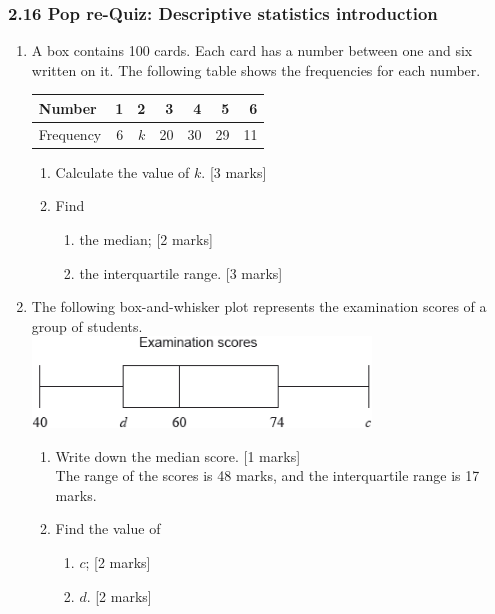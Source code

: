 \documentclass[12pt, twoside]{article}
\begin{document}
\subsubsection*{2.16 Pop re-Quiz: Descriptive statistics introduction}

\begin{enumerate} 
 
  \item A box contains 100 cards. Each card has a number between one and six written on it. The following table shows the frequencies for each number.
  
  \begin{tabular}{|l|r|r|r|r|r|r|}
    \hline
    Number & 1 & 2 & 3 & 4 & 5 & 6\\ 
    \hline 
    Frequency & 6 & $k$ & 20 & 30 & 29 & 11\\ 
    \hline 
    \end{tabular}

  \begin{enumerate}
    \item Calculate the value of $k$. \hfill [3 marks] \vspace{2cm}
    \item Find
    \begin{enumerate}
      \item the median; \hfill [2 marks] \vspace{2cm}
      \item the interquartile range. \hfill [3 marks] \vspace{2cm}
    \end{enumerate}
  \end{enumerate}

  \item The following box-and-whisker plot represents the examination scores of a group of students.\\
  \includegraphics[width=9cm]{2-16exam-scores-box-plot.png}
  \begin{enumerate}
    \item Write down the median score. \hfill [1 marks]\\[1.25cm]
    The range of the scores is 48 marks, and the interquartile range is 17 marks.
    \item Find the value of
    \begin{enumerate}
      \item $c$; \hfill [2 marks] \vspace{1.5cm}
      \item $d$. \hfill [2 marks] \vspace{1.5cm}
    \end{enumerate}
  \end{enumerate}


\end{enumerate}
\end{document}
